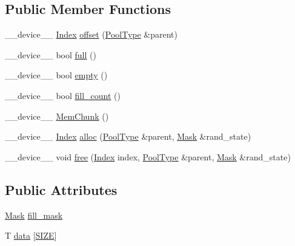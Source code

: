 \subsection*{Public Member Functions}
\begin{DoxyCompactItemize}
\item 
\-\_\-\-\_\-device\-\_\-\-\_\- \hyperlink{structMemChunk_a8fd5e130634e3d9ea4084153b2a242c8}{Index} \hyperlink{structMemChunk_a07c8fed688981d9968d30b6c91479945}{offset} (\hyperlink{structMemChunk_a88683909c81aefbc29e3542d99482545}{Pool\-Type} \&parent)
\item 
\-\_\-\-\_\-device\-\_\-\-\_\- bool \hyperlink{structMemChunk_a9a1150a5d3c783b743702508b1d9037a}{full} ()
\item 
\-\_\-\-\_\-device\-\_\-\-\_\- bool \hyperlink{structMemChunk_a0a593fae8e1f3ce24ebd4dfbd3fb3cdb}{empty} ()
\item 
\-\_\-\-\_\-device\-\_\-\-\_\- bool \hyperlink{structMemChunk_a076fe2699b64d5b5a8681d9dd983cb5c}{fill\-\_\-count} ()
\item 
\-\_\-\-\_\-device\-\_\-\-\_\- \hyperlink{structMemChunk_ad1dd808abece2dfbcf4d5b75fa708b28}{Mem\-Chunk} ()
\item 
\-\_\-\-\_\-device\-\_\-\-\_\- \hyperlink{structMemChunk_a8fd5e130634e3d9ea4084153b2a242c8}{Index} \hyperlink{structMemChunk_a7f9f54f94a4d8ee4b254b5dd6c4c8527}{alloc} (\hyperlink{structMemChunk_a88683909c81aefbc29e3542d99482545}{Pool\-Type} \&parent, \hyperlink{structMemChunk_aee69d5019f70b5b3b7196a60b80fb3ac}{Mask} \&rand\-\_\-state)
\item 
\-\_\-\-\_\-device\-\_\-\-\_\- void \hyperlink{structMemChunk_ab0bd7ee43d0aaca59fdbc69ad4e8c4e9}{free} (\hyperlink{structMemChunk_a8fd5e130634e3d9ea4084153b2a242c8}{Index} index, \hyperlink{structMemChunk_a88683909c81aefbc29e3542d99482545}{Pool\-Type} \&parent, \hyperlink{structMemChunk_aee69d5019f70b5b3b7196a60b80fb3ac}{Mask} \&rand\-\_\-state)
\end{DoxyCompactItemize}
\subsection*{Public Attributes}
\begin{DoxyCompactItemize}
\item 
\hyperlink{structMemChunk_aee69d5019f70b5b3b7196a60b80fb3ac}{Mask} \hyperlink{structMemChunk_a739baec0d83624ec803a185b16197a41}{fill\-\_\-mask}
\item 
T \hyperlink{structMemChunk_a09489aed8564c7ded0a29a029337073f}{data} \mbox{[}\hyperlink{structMemChunk_a9f2b3f4f9c9d0b019f287be6796e2da3}{S\-I\-Z\-E}\mbox{]}
\end{DoxyCompactItemize}
